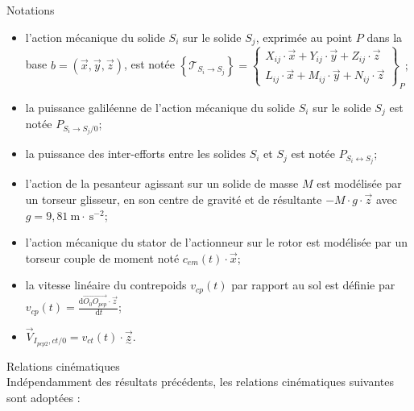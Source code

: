 \documentclass[10pt]{article}
\begin{document}
Notations

\begin{itemize}
  \item[-] l'action mécanique du solide $S_{i}$ sur le solide $S_{j}$, exprimée au point $P$ dans la base $b=(\vec{x}, \vec{y}, \vec{z})$, est notée $\left\{\mathcal{T}_{S_{i} \rightarrow S_{j}}\right\}=\left\{\begin{array}{c}X_{i j} \cdot \vec{x}+Y_{i j} \cdot \vec{y}+Z_{i j} \cdot \vec{z} \\ L_{i j} \cdot \vec{x}+M_{i j} \cdot \vec{y}+N_{i j} \cdot \vec{z}\end{array}\right\}_{P} ;$
  \item[-] la puissance galiléenne de l'action mécanique du solide $S_{i}$ sur le solide $S_{j}$ est notée $P_{S_{i} \rightarrow S_{j} / 0}$;
  \item[-] la puissance des inter-efforts entre les solides $S_{i}$ et $S_{j}$ est notée $P_{S_{i} \leftrightarrow S_{j}}$;
  \item[-] l'action de la pesanteur agissant sur un solide de masse $M$ est modélisée par un torseur glisseur, en son centre de gravité et de résultante $-M \cdot g \cdot \vec{z}$ avec $g=9,81 \mathrm{~m} \cdot \mathrm{~s}^{-2}$;
  \item[-] l'action mécanique du stator de l'actionneur sur le rotor est modélisée par un torseur couple de moment noté $c_{e m}(t) \cdot \vec{x}$;
  \item[-] la vitesse linéaire du contrepoids $v_{c p}(t)$ par rapport au sol est définie par $v_{c p}(t)=\frac{\mathrm{d} \overrightarrow{O_{0} O_{p c p}} \cdot \vec{z}}{\mathrm{~d} t}$;
  \item[-] $\vec{V}_{I_{p c p 2}, c t / 0}=v_{c t}(t) \cdot \underset{\sim}{\vec{z}}$.
\end{itemize}

Relations cinématiques\\
Indépendamment des résultats précédents, les relations cinématiques suivantes sont adoptées :
\end{document}
